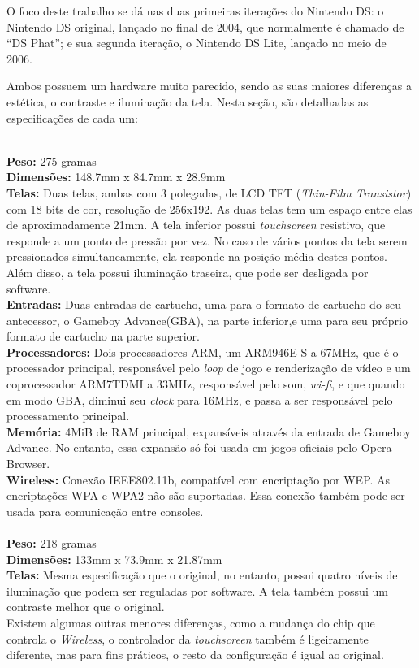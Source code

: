 \documentclass[brazil]{abnt}
\begin{document}
O foco deste trabalho se dá nas duas primeiras iterações do Nintendo DS: o Nintendo DS original, lançado no final de 2004, que normalmente é chamado de ``DS Phat''; e sua segunda iteração, o Nintendo DS Lite, lançado no meio de 2006.

Ambos possuem um hardware muito parecido, sendo as suas maiores diferenças a estética, o contraste e iluminação da tela. Nesta seção, são detalhadas as especificações de cada um:

\\
{\bf Peso:} 275 gramas\\
{\bf Dimensões:} 148.7mm x 84.7mm x 28.9mm\\
{\bf Telas:} Duas telas, ambas com 3 polegadas, de LCD TFT (\textit{Thin-Film Transistor}) com 18 bits de cor, resolução de 256x192. As duas telas tem um espaço entre elas de aproximadamente 21mm. A tela inferior possui \textit{touchscreen} resistivo, que responde a um ponto de pressão por vez. No caso de vários pontos da tela serem pressionados simultaneamente, ela responde na posição média destes pontos.\\
Além disso, a tela possui iluminação traseira, que pode ser desligada por software.\\
{\bf Entradas:} Duas entradas de cartucho, uma para o formato de cartucho do seu antecessor, o Gameboy Advance(GBA), na parte inferior,e uma para seu próprio formato de cartucho na parte superior.\\
{\bf Processadores:} Dois processadores ARM, um ARM946E-S a 67MHz, que é o processador principal, responsável pelo \textit{loop} de jogo e renderização de vídeo e um coprocessador ARM7TDMI a 33MHz, responsável pelo som, \textit{wi-fi}, e que quando em modo GBA, diminui seu \textit{clock} para 16MHz, e passa a ser responsável pelo processamento principal.\\
{\bf Memória:} 4MiB de RAM principal, expansíveis através da entrada de Gameboy Advance. No entanto, essa expansão só foi usada em jogos oficiais pelo Opera Browser.\\
{\bf Wireless:} Conexão IEEE802.11b, compatível com encriptação por WEP. As encriptações WPA e WPA2 não são suportadas. Essa conexão também pode ser usada para comunicação entre consoles.\\

\\
{\bf Peso:} 218 gramas\\
{\bf Dimensões:} 133mm x 73.9mm x 21.87mm\\
{\bf Telas:} Mesma especificação que o original, no entanto, possui quatro níveis de iluminação que podem ser reguladas por software. A tela também possui um contraste melhor que o original.\\
Existem algumas outras menores diferenças, como a mudança do chip que controla o \textit{Wireless}, o controlador da \textit{touchscreen} também é ligeiramente diferente, mas para fins práticos, o resto da configuração é igual ao original.
\end{document}
